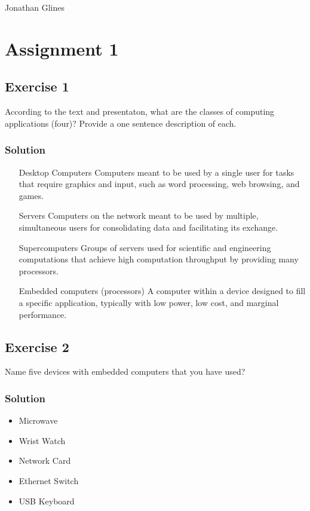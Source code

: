 \documentclass[12pt]{article}
\begin{document}
\begin{flushright}
\Large{Jonathan Glines}
\end{flushright}
\section*{Assignment 1}
\subsection*{Exercise 1}
According to the text and presentaton, what are the classes of computing applications (four)? Provide a one sentence description of each.
\subsubsection*{Solution}
\begin{itemize}
\item[Desktop Computers] Computers meant to be used by a single user for tasks that require graphics and input, such as word processing, web browsing, and games.
\item[Servers] Computers on the network meant to be used by multiple, simultaneous users for consolidating data and facilitating its exchange.
\item[Supercomputers] Groups of servers used for scientific and engineering computations that achieve high computation throughput by providing many processors.
\item[Embedded computers (processors)] A computer within a device designed to fill a specific application, typically with low power, low cost, and marginal performance.
\end{itemize}

\subsection*{Exercise 2}
Name five devices with embedded computers that you have used?
\subsubsection*{Solution}
\begin{itemize}
\item Microwave
\item Wrist Watch
\item Network Card
\item Ethernet Switch
\item USB Keyboard
\end{itemize}
\end{document}
